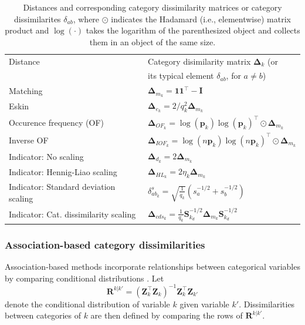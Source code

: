 \documentclass[12pt]{article}
\begin{document}
\begin{table}[!ht]
\caption{Distances and corresponding category dissimilarity matrices or category dissimilarites $\delta_{ab}$, where $\odot$ indicates the Hadamard (i.e., elementwise) matrix product and $\log(\cdot)$ takes the logarithm of the parenthesized object and collects them in an object of the same size.}
\label{table:deltas}
\centering
\begin{tabular}{ll}
\toprule
Distance & Category disimilarity matrix $\bm{\Delta}_k$ (or \\ & its typical element $\delta_{ab}$, for $a \neq b$)  \\ \midrule
Matching  & $\bm{\Delta}_{m_k} = \mathbf{1} \mathbf{1}^{\top} - \mathbf{I}$  \\
Eskin & $\bm{\Delta}_{e_{k}} = 2/q_k^2\bm{\Delta}_{m_k}$ \\
Occurence frequency (OF) & $\bm{\Delta}_{OF_{k}} = \log(\mathbf{p}_k)\log(\mathbf{p}_k)^{\top} \odot \bm{\Delta}_{m_k}$  \\
Inverse OF & $\bm{\Delta}_{IOF_{k}} = \log(n\mathbf{p}_k)\log(n\mathbf{p}_k)^{\top} \odot \bm{\Delta}_{m_k}$ \\
\midrule
Indicator: No scaling & $\bm{\Delta}_{d_{k}}=2\bm{\Delta}_{m_k}$  \\
Indicator: Hennig-Liao scaling & $\bm{\Delta}_{HL_{k}} = 2\eta_{k}\bm{\Delta}_{m_k}$ \\
Indicator: Standard deviation scaling & $\delta^{s}_{ab_{k}}=\sqrt{\frac{1}{q_k}} (s^{-1/2}_a + s^{-1/2}_b )$ \\
Indicator: Cat. dissimilarity scaling & $\bm{\Delta}_{cds_{k}}=\frac{1}{q_k}\mathbf{S}^{-1/2}_{k_d}\bm{\Delta}_{m_k} \mathbf{S}^{-1/2}_{k_d} $\\
\bottomrule
\end{tabular}
\end{table}

\subsubsection{Association-based category dissimilarities} \label{sect:catdist_ab}
Association-based methods incorporate relationships between categorical variables by comparing conditional distributions \parencite[e.g.,][]{LH:2005,AD:2007,JCL:2014,ROBNLH:2015}. Let
\begin{equation*}
    \mathbf{R}^{k|k'} = (\mathbf{Z}_k^\top \mathbf{Z}_k)^{-1} \mathbf{Z}_k^\top \mathbf{Z}_{k'}
\end{equation*}
denote the conditional distribution of variable $k$ given variable $k'$.
Dissimilarities between categories of $k$ are then defined by comparing the rows of $\mathbf{R}^{k|k'}$.
\end{document}
